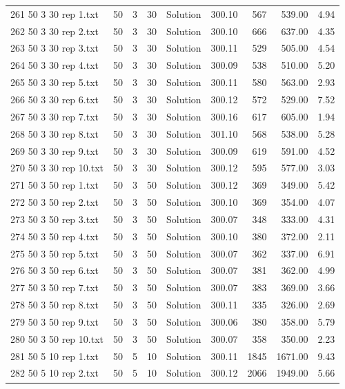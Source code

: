 \begin{longtable}{lrrllrrrr}
261 50 3 30 rep 1.txt & 50 & 3 & 30 & Solution & 300.10 & 567 & 539.00 &  4.94\\
262 50 3 30 rep 2.txt & 50 & 3 & 30 & Solution & 300.10 & 666 & 637.00 &  4.35\\
263 50 3 30 rep 3.txt & 50 & 3 & 30 & Solution & 300.11 & 529 & 505.00 &  4.54\\
264 50 3 30 rep 4.txt & 50 & 3 & 30 & Solution & 300.09 & 538 & 510.00 &  5.20\\
265 50 3 30 rep 5.txt & 50 & 3 & 30 & Solution & 300.11 & 580 & 563.00 &  2.93\\
266 50 3 30 rep 6.txt & 50 & 3 & 30 & Solution & 300.12 & 572 & 529.00 &  7.52\\
267 50 3 30 rep 7.txt & 50 & 3 & 30 & Solution & 300.16 & 617 & 605.00 &  1.94\\
268 50 3 30 rep 8.txt & 50 & 3 & 30 & Solution & 301.10 & 568 & 538.00 &  5.28\\
269 50 3 30 rep 9.txt & 50 & 3 & 30 & Solution & 300.09 & 619 & 591.00 &  4.52\\
270 50 3 30 rep 10.txt & 50 & 3 & 30 & Solution & 300.12 & 595 & 577.00 &  3.03\\
271 50 3 50 rep 1.txt & 50 & 3 & 50 & Solution & 300.12 & 369 & 349.00 &  5.42\\
272 50 3 50 rep 2.txt & 50 & 3 & 50 & Solution & 300.10 & 369 & 354.00 &  4.07\\
273 50 3 50 rep 3.txt & 50 & 3 & 50 & Solution & 300.07 & 348 & 333.00 &  4.31\\
274 50 3 50 rep 4.txt & 50 & 3 & 50 & Solution & 300.10 & 380 & 372.00 &  2.11\\
275 50 3 50 rep 5.txt & 50 & 3 & 50 & Solution & 300.07 & 362 & 337.00 &  6.91\\
276 50 3 50 rep 6.txt & 50 & 3 & 50 & Solution & 300.07 & 381 & 362.00 &  4.99\\
277 50 3 50 rep 7.txt & 50 & 3 & 50 & Solution & 300.07 & 383 & 369.00 &  3.66\\
278 50 3 50 rep 8.txt & 50 & 3 & 50 & Solution & 300.11 & 335 & 326.00 &  2.69\\
279 50 3 50 rep 9.txt & 50 & 3 & 50 & Solution & 300.06 & 380 & 358.00 &  5.79\\
280 50 3 50 rep 10.txt & 50 & 3 & 50 & Solution & 300.07 & 358 & 350.00 &  2.23\\
281 50 5 10 rep 1.txt & 50 & 5 & 10 & Solution & 300.11 & 1845 & 1671.00 &  9.43\\
282 50 5 10 rep 2.txt & 50 & 5 & 10 & Solution & 300.12 & 2066 & 1949.00 &  5.66\\

\end{longtable}

